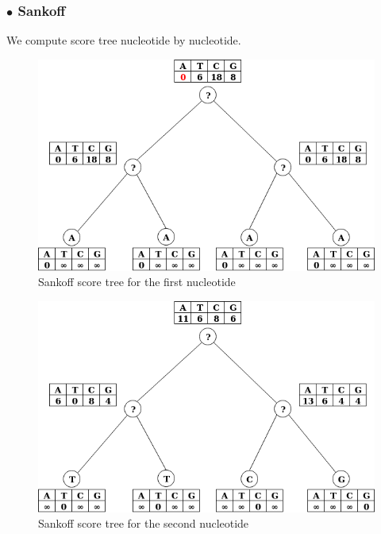 \documentclass[]{article}
\begin{document}
\subsubsection*{$\bullet$ Sankoff }
We compute score tree nucleotide by nucleotide.
\begin{figure}[h]
	\includegraphics*[width = \linewidth]{image/tree_1.png}
	\caption{Sankoff score tree for the first nucleotide  }
\end{figure}

\begin{figure}[h!]
	\includegraphics*[width = \linewidth]{image/tree_2.png}
	\caption{Sankoff score tree for the second nucleotide  }	
\end{figure}
\end{document}
